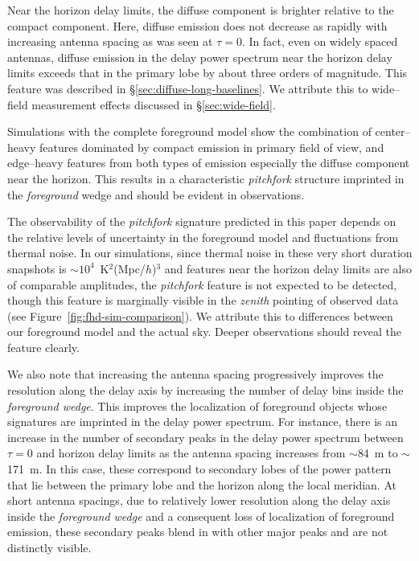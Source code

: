 \documentclass[preprint2,iop,numberedappendix,twocolappendix,appendixfloats]{emulateapj}
\begin{document}
Near the horizon delay limits, the diffuse component is brighter relative to the compact component. Here, diffuse emission does not decrease as rapidly with increasing antenna spacing as was seen at $\tau=0$. In fact, even on widely spaced antennas, diffuse emission in the delay power spectrum near the horizon delay limits exceeds that in the primary lobe by about three orders of magnitude. This feature was described in \S\ref{sec:diffuse-long-baselines}. We attribute this to wide--field measurement effects discussed in \S\ref{sec:wide-field}. 

Simulations with the complete foreground model show the combination of center--heavy features dominated by compact emission in primary field of view, and edge--heavy features from both types of emission especially the diffuse component near the horizon. This results in a characteristic {\it pitchfork} structure imprinted in the {\it foreground} wedge and should be evident in observations.

The observability of the {\it pitchfork} signature predicted in this paper depends on the relative levels of uncertainty in the foreground model and fluctuations from thermal noise. In our simulations, since thermal noise in these very short duration snapshots is $\sim 10^4$~K$^2$(Mpc/$h$)$^3$ and features near the horizon delay limits are also of comparable amplitudes, the {\it pitchfork} feature is not expected to be detected, though this feature is marginally visible in the {\it zenith} pointing of observed data (see Figure~\ref{fig:fhd-sim-comparison}). We attribute this to differences between our foreground model and the actual sky.  Deeper observations should reveal the feature clearly.

We also note that increasing the antenna spacing progressively improves the resolution along the delay axis by increasing the number of delay bins inside the {\it foreground wedge}. This improves the localization of foreground objects whose signatures are imprinted in the delay power spectrum. For instance, there is an increase in the number of secondary peaks in the delay power spectrum between $\tau=0$ and horizon delay limits as the antenna spacing increases from $\sim$84~m to $\sim$171~m. In this case, these correspond to secondary lobes of the power pattern that lie between the primary lobe and the horizon along the local meridian. At short antenna spacings, due to relatively lower resolution along the delay axis inside the {\it foreground wedge} and a consequent loss of localization of foreground emission, these secondary peaks blend in with other major peaks and are not distinctly visible. 
\end{document}
